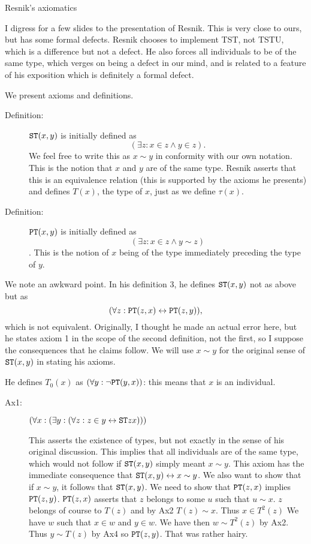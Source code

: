 \documentclass{slides}
\begin{document}
\begin{slide}

{\Large Resnik's axiomatics}

I digress for a few slides to the presentation of Resnik.  This is very close to ours, but has some formal defects.  Resnik chooses to implement TST, not TSTU, which is a difference but not a defect.  He also forces all individuals to be of the same type, which verges on being a defect in our mind, and is related to a feature of his exposition which is definitely a formal defect.

We present axioms and definitions.

\begin{description}


\item[Definition:]  ${\tt ST}(x,y)$ is initially defined as $$(\exists z:x \in z \wedge y \in z).$$  We feel free to write this as $x \sim y$ in conformity with our own notation.  This is the notion that $x$ and $y$ are of the same type.  Resnik asserts that
this is an equivalence relation (this is supported by the axioms he presents) and defines $T(x)$, the type of $x$, just as we define $\tau(x)$.

\item[Definition:]  ${\tt PT}(x,y)$ is initially defined as $$(\exists z:x \in z \wedge y \sim z)$$.  This is the notion of $x$ being of the type immediately preceding the type of $y$.

\end{description}

We note an awkward point.   In his definition 3, he defines ${\tt ST}(x,y)$ not as above but as $$(\forall z:{\tt PT}(z,x) \leftrightarrow {\tt PT}(z,y)),$$ which is not equivalent.  Originally,
I thought he made an actual error here, but he states axiom 1 in the scope of the second definition, not the first, so I suppose the consequences that he claims follow.  We will use
$x \sim y$ for the original sense of ${\tt ST}(x,y)$ in stating his axioms.

He defines $T_0(x)$ as $(\forall y:\neg {\tt PT}(y,x))$:  this means that $x$ is an individual.

\begin{description}

\item[Ax1:]   $(\forall x:(\exists y:(\forall z:z \in y \leftrightarrow {\tt ST}zx)))$

This asserts the existence of types, but not exactly in the sense of his original discussion.  This implies that all individuals are of the same type, which would not follow if ${\tt ST}(x,y)$ simply meant $x \sim y$.  This
axiom has the immediate consequence that ${\tt ST}(x,y) \leftrightarrow x \sim y$.    We also want to show that if $x \sim y$, it follows that ${\tt ST}(x,y)$.  We need to show that ${\tt PT}(z,x)$ implies ${\tt PT}(z,y)$.  ${\tt PT}(z,x)$ asserts that
$z$ belongs to some $u$ such that $u \sim x$.  $z$ belongs of course to $T(z)$ and by Ax2 $T(z) \sim x$.  Thus $x \in T^2(z)$  We have $w$ such that $x \in w$ and $y \in w$.  We have then $w \sim T^2(z)$ by Ax2.  Thus $y \sim T(z)$ by Ax4 so ${\tt PT}(z,y)$.  That was rather hairy.


\end{description}
\end{slide}
\end{document}
